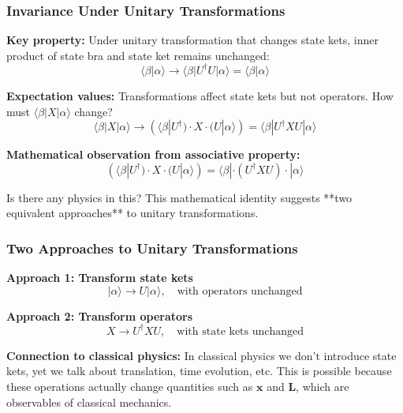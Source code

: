 \documentclass[11pt,a4paper]{article}
\begin{document}
\subsubsection{Invariance Under Unitary Transformations}

\textbf{Key property:} Under unitary transformation that changes state kets, inner product of state bra and state ket remains unchanged:
\begin{equation}
\langle\beta|\alpha\rangle \to \langle\beta|U^\dagger U|\alpha\rangle = \langle\beta|\alpha\rangle
\tag{2.76}
\end{equation}

\textbf{Expectation values:} Transformations affect state kets but not operators. How must $\langle\beta|X|\alpha\rangle$ change?
\begin{equation}
\langle\beta|X|\alpha\rangle \to (\langle\beta|U^\dagger) \cdot X \cdot (U|\alpha\rangle) = \langle\beta|U^\dagger XU|\alpha\rangle
\tag{2.77}
\end{equation}

\textbf{Mathematical observation from associative property:}
\begin{equation}
(\langle\beta|U^\dagger) \cdot X \cdot (U|\alpha\rangle) = \langle\beta| \cdot (U^\dagger XU) \cdot |\alpha\rangle
\tag{2.78}
\end{equation}

Is there any physics in this? This mathematical identity suggests **two equivalent approaches** to unitary transformations.

\subsubsection{Two Approaches to Unitary Transformations}

\textbf{Approach 1: Transform state kets}
\begin{equation}
|\alpha\rangle \to U|\alpha\rangle, \quad \text{with operators unchanged}
\tag{2.79a}
\end{equation}

\textbf{Approach 2: Transform operators}
\begin{equation}
X \to U^\dagger XU, \quad \text{with state kets unchanged}
\tag{2.79b}
\end{equation}

\textbf{Connection to classical physics:} In classical physics we don't introduce state kets, yet we talk about translation, time evolution, etc. This is possible because these operations actually change quantities such as $\mathbf{x}$ and $\mathbf{L}$, which are observables of classical mechanics.
\end{document}
